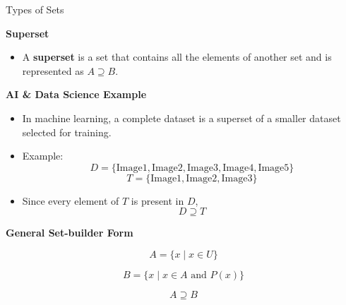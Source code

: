 \documentclass{beamer}
\begin{document}
\begin{frame}{Types of Sets}

\textbf{Superset}

\begin{itemize}
    \item A \textbf{superset} is a set that contains all the elements of another set and is represented as \(A \supseteq B\).
\end{itemize}

\vspace{0.3cm}

\textbf{AI \& Data Science Example}

\begin{itemize}
    \item In machine learning, a complete dataset is a superset of a smaller dataset selected for training.
    \item Example:
    \[
    D=\{\text{Image1},\text{Image2},\text{Image3},\text{Image4},\text{Image5}\}
    \]
    \[
    T=\{\text{Image1},\text{Image2},\text{Image3}\}
    \]
    \item Since every element of \(T\) is present in \(D\),
    \[
    D\supseteq T
    \]
\end{itemize}

\vspace{0.3cm}

\textbf{General Set-builder Form}

\[
A=\{x \mid x\in U\}
\]

\[
B=\{x \mid x\in A \text{ and } P(x)\}
\]

\[
A\supseteq B
\]

\end{frame}
\end{document}
